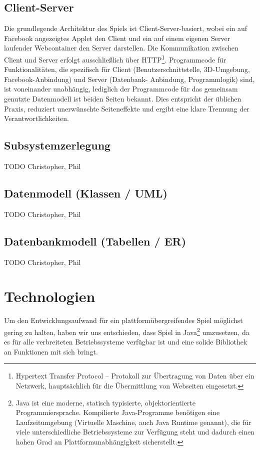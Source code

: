 \documentclass[a4paper,12pt]{scrartcl}
\begin{document}
\subsection{Client-Server}
Die grundlegende Architektur des Spiels ist Client-Server-basiert, wobei ein auf
Facebook angezeigtes Applet den Client und ein auf einem eigenen Server laufender
Webcontainer den Server darstellen. Die Kommunikation zwischen Client und Server erfolgt
ausschließlich über HTTP\footnote{Hypertext Transfer Protocol -- Protokoll zur
Übertragung von Daten über ein Netzwerk, hauptsächlich für die Übermittlung
von Webseiten eingesetzt.}. Programmcode für Funktionalitäten, die spezifisch
für Client (Benutzerschnittstelle, 3D-Umgebung, Facebook-Anbindung) und Server (Datenbank- Anbindung, Programmlogik) sind, ist voneinander unabhängig, lediglich der Programmcode für das gemeinsam genutzte Datenmodell ist beiden Seiten bekannt. Dies entspricht der üblichen Praxis, reduziert unerwünschte Seiteneffekte und ergibt eine klare Trennung der
Verantwortlichkeiten.

\subsection{Subsystemzerlegung}
TODO Christopher, Phil

\subsection{Datenmodell (Klassen / UML)}
TODO Christopher, Phil

\subsection{Datenbankmodell (Tabellen / ER)}
TODO Christopher, Phil

\section{Technologien}
Um den Entwicklungsaufwand für ein plattformübergreifendes Spiel möglichst gering
zu halten, haben wir uns entschieden, dass Spiel in Java\footnote{Java ist eine moderne, statisch typisierte, objektorientierte Programmiersprache. Kompilierte Java-Programme benötigen eine Laufzeitumgebung (Virtuelle Maschine, auch Java Runtime genannt), die für viele unterschiedliche Betriebssysteme zur Verfügung steht und dadurch einen hohen Grad an Plattformunabhängigkeit sicherstellt.} umzusetzen, da es für alle
verbreiteten Betriebssysteme verfügbar ist und eine solide Bibliothek an Funktionen mit sich
bringt.
\end{document}
